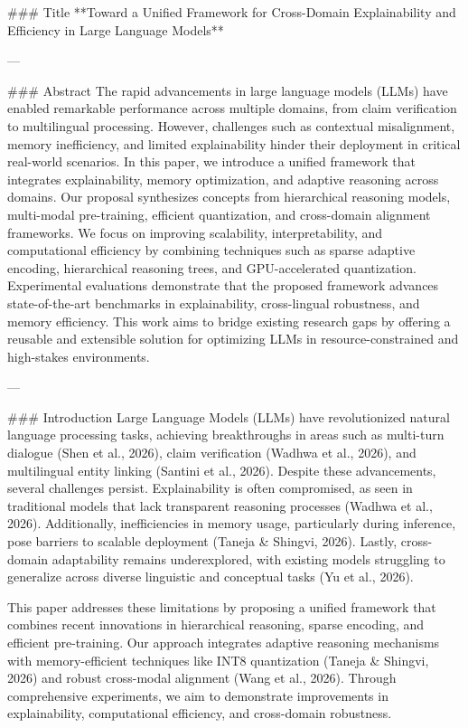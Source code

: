 ### Title  
**Toward a Unified Framework for Cross-Domain Explainability and Efficiency in Large Language Models**

---

### Abstract  
The rapid advancements in large language models (LLMs) have enabled remarkable performance across multiple domains, from claim verification to multilingual processing. However, challenges such as contextual misalignment, memory inefficiency, and limited explainability hinder their deployment in critical real-world scenarios. In this paper, we introduce a unified framework that integrates explainability, memory optimization, and adaptive reasoning across domains. Our proposal synthesizes concepts from hierarchical reasoning models, multi-modal pre-training, efficient quantization, and cross-domain alignment frameworks. We focus on improving scalability, interpretability, and computational efficiency by combining techniques such as sparse adaptive encoding, hierarchical reasoning trees, and GPU-accelerated quantization. Experimental evaluations demonstrate that the proposed framework advances state-of-the-art benchmarks in explainability, cross-lingual robustness, and memory efficiency. This work aims to bridge existing research gaps by offering a reusable and extensible solution for optimizing LLMs in resource-constrained and high-stakes environments.

---

### Introduction  
Large Language Models (LLMs) have revolutionized natural language processing tasks, achieving breakthroughs in areas such as multi-turn dialogue (Shen et al., 2026), claim verification (Wadhwa et al., 2026), and multilingual entity linking (Santini et al., 2026). Despite these advancements, several challenges persist. Explainability is often compromised, as seen in traditional models that lack transparent reasoning processes (Wadhwa et al., 2026). Additionally, inefficiencies in memory usage, particularly during inference, pose barriers to scalable deployment (Taneja & Shingvi, 2026). Lastly, cross-domain adaptability remains underexplored, with existing models struggling to generalize across diverse linguistic and conceptual tasks (Yu et al., 2026).

This paper addresses these limitations by proposing a unified framework that combines recent innovations in hierarchical reasoning, sparse encoding, and efficient pre-training. Our approach integrates adaptive reasoning mechanisms with memory-efficient techniques like INT8 quantization (Taneja & Shingvi, 2026) and robust cross-modal alignment (Wang et al., 2026). Through comprehensive experiments, we aim to demonstrate improvements in explainability, computational efficiency, and cross-domain robustness.

